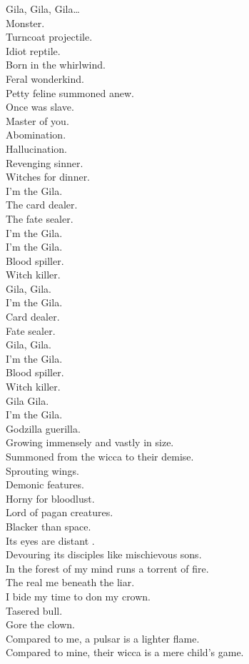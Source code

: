Gila, Gila, Gila… \\
Monster. \\

Turncoat projectile. \\
Idiot reptile. \\
Born in the whirlwind. \\
Feral wonderkind. \\
Petty feline summoned anew. \\
Once was slave. \\
Master of you. \\
Abomination. \\
Hallucination. \\
Revenging sinner. \\
Witches for dinner. \\
I'm the Gila. \\
The card dealer. \\
The fate sealer. \\
I'm the Gila. \\

I'm the Gila. \\
Blood spiller. \\
Witch killer. \\
Gila, Gila. \\
I'm the Gila. \\
Card dealer. \\
Fate sealer. \\
Gila, Gila. \\
I'm the Gila. \\
Blood spiller. \\
Witch killer. \\
Gila Gila. \\
I'm the Gila. \\
Godzilla guerilla. \\

Growing immensely and vastly in size. \\
Summoned from the wicca to their demise. \\
Sprouting wings. \\
Demonic features. \\
Horny for bloodlust. \\
Lord of pagan creatures. \\
Blacker than space. \\
Its eyes are distant . \\
Devouring its disciples like mischievous sons. \\
In the forest of my mind runs a torrent of fire. \\
The real me beneath the liar. \\
I bide my time to don my crown. \\
Tasered bull. \\
Gore the clown. \\
Compared to me, a pulsar is a lighter flame. \\
Compared to mine, their wicca is a mere child's game. \\

